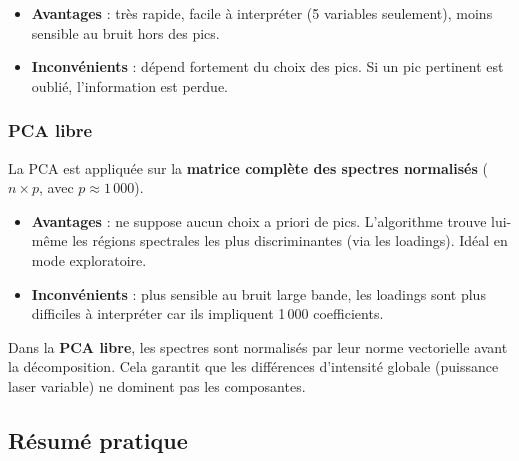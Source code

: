 \documentclass[12pt, a4paper]{article}
\begin{document}
\begin{itemize}
  \item \textbf{Avantages} : très rapide, facile à interpréter (5 variables
        seulement), moins sensible au bruit hors des pics.
  \item \textbf{Inconvénients} : dépend fortement du choix des pics. Si un
        pic pertinent est oublié, l'information est perdue.
\end{itemize}

\subsubsection{PCA libre}

La PCA est appliquée sur la \textbf{matrice complète des spectres normalisés}
($n \times p$, avec $p \approx 1\,000$).

\begin{itemize}
  \item \textbf{Avantages} : ne suppose aucun choix a priori de pics.
        L'algorithme trouve lui-même les régions spectrales les plus
        discriminantes (via les loadings). Idéal en mode exploratoire.
  \item \textbf{Inconvénients} : plus sensible au bruit large bande,
        les loadings sont plus difficiles à interpréter car ils impliquent
        1\,000 coefficients.
\end{itemize}

\begin{attention}
Dans la \textbf{PCA libre}, les spectres sont normalisés par leur norme
vectorielle avant la décomposition. Cela garantit que les différences
d'intensité globale (puissance laser variable) ne dominent pas les composantes.
\end{attention}
\newpage
\subsection{Résumé pratique}
\end{document}
